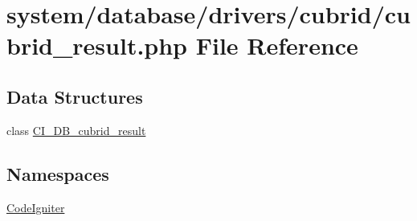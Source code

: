 \hypertarget{cubrid__result_8php}{\section{system/database/drivers/cubrid/cubrid\-\_\-result.php File Reference}
\label{cubrid__result_8php}
}
\subsection*{Data Structures}
\begin{DoxyCompactItemize}
\item 
class \hyperlink{class_c_i___d_b__cubrid__result}{C\-I\-\_\-\-D\-B\-\_\-cubrid\-\_\-result}
\end{DoxyCompactItemize}
\subsection*{Namespaces}
\begin{DoxyCompactItemize}
\item 
\hyperlink{namespace_code_igniter}{Code\-Igniter}
\end{DoxyCompactItemize}
